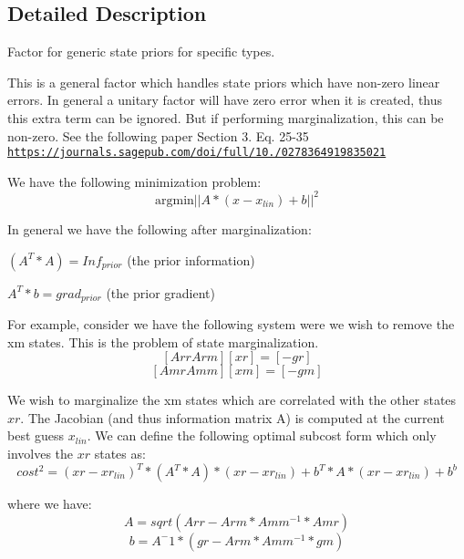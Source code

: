 \subsection{Detailed Description}
Factor for generic state priors for specific types. 

This is a general factor which handles state priors which have non-\/zero linear errors. In general a unitary factor will have zero error when it is created, thus this extra term can be ignored. But if performing marginalization, this can be non-\/zero. See the following paper Section 3. Eq. 25-\/35 \href{https://journals.sagepub.com/doi/full/10.1177/0278364919835021}{\tt https\+://journals.\+sagepub.\+com/doi/full/10./0278364919835021}

We have the following minimization problem\+: \[ \textrm{argmin} ||A * (x - x_{lin}) + b||^2 \]

In general we have the following after marginalization\+:
\begin{DoxyItemize}
\item $(A^T*A) = Inf_{prior} $ (the prior information)
\item $A^T*b = grad_{prior} $ (the prior gradient)
\end{DoxyItemize}

For example, consider we have the following system were we wish to remove the xm states. This is the problem of state marginalization. \[ [ Arr Arm ] [ xr ] = [ - gr ] \] \[ [ Amr Amm ] [ xm ] = [ - gm ] \]

We wish to marginalize the xm states which are correlated with the other states $ xr $. The Jacobian (and thus information matrix A) is computed at the current best guess $ x_{lin} $. We can define the following optimal subcost form which only involves the $ xr $ states as\+: \[ cost^2 = (xr - xr_{lin})^T*(A^T*A)*(xr - xr_{lin}) + b^T*A*(xr - xr_{lin}) + b^b \]

where we have\+: \[ A = sqrt(Arr - Arm*Amm^{-1}*Amr) \] \[ b = A^-1 * (gr - Arm*Amm^{-1}*gm) \] 
